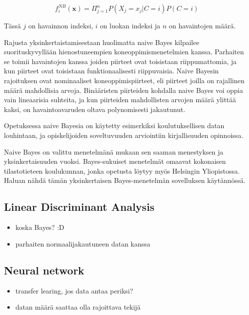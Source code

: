 \documentclass[finnish,twoside,openright]{HYgraduMLDS}
\begin{document}
\begin{equation}
    f^{NB}_i(\textbf{x}) = \Pi^n_{j=1} P(X_j=x_j | C=i) P(C=i)
\end{equation}

Tässä $j$ on havainnon indeksi, $i$ on luokan indeksi ja $n$ on havaintojen määrä. 

Rajusta yksinkertaistamisestaan huolimatta naive Bayes kilpailee suorituskyvyllään hienostuneempien koneoppimismenetelmien kanssa\cite{rish2001empirical}. Parhaiten se toimii havaintojen kanssa joiden piirteet ovat toisistaan riippumattomia, ja kun piirteet ovat toisistaan funktionaalisesti riippuvaisia. Naive Bayesin rajoituksen ovat nominaaliset koneoppimispiirteet, eli piirteet joilla on rajallinen määrä mahdollisia arvoja. Binääristen piirteiden kohdalla naive Bayes voi oppia vain lineaarisia suhteita, ja kun piirteiden mahdollisten arvojen määrä ylittää kaksi, on havaintoavaruden oltava polynomisesti jakautunut\cite{rish2001empirical}.

Opetuksessa naive Bayesia on käytetty esimerkiksi koulutuksellisen datan louhintaan\cite{bhardwaj2012data}, ja opiskelijoiden soveltuvuuden arviointiin kirjallisuuden opinnoissa\cite{hellas2018predicting}.

Naive Bayes on valittu menetelmänä mukaan sen saaman menestyksen ja yksinkertaisuuden vuoksi. Bayes-sukuiset menetelmät omaavat kokonaisen tilastotieteen koulukunnan, jonka opetusta löytyy myös Helsingin Yliopistossa. Haluan nähdä tämän yksinkertaisen Bayes-menetelmän sovelluksen käytännössä.


\subsection{Linear Discriminant Analysis}

\begin{itemize}
    \item koska Bayes? :D
    \item parhaiten normaalijakautuneen datan kanssa
\end{itemize}


\subsection{Neural network}

\begin{itemize}
    \item transfer learing, jos data antaa periksi?
    \item datan määrä saattaa olla rajoittava tekijä
\end{itemize}
\end{document}
